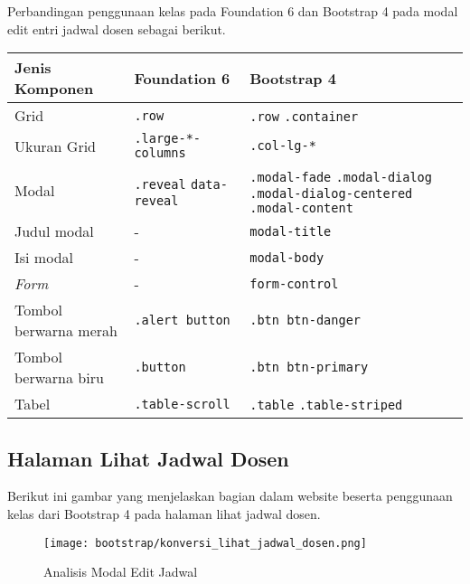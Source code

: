 \noindent Perbandingan penggunaan kelas pada Foundation 6 dan Bootstrap 4 pada modal edit entri jadwal dosen sebagai berikut.\\
\begin{tabular}{| p{} | p{} | p{} |} 
	\hline
	\textbf{Jenis Komponen} & \textbf{Foundation 6} & \textbf{Bootstrap 4}  \\ [0.5ex] 
	\hline	
	Grid & \texttt{.row} & \texttt{.row} \newline \texttt{.container} \\
	\hline
	Ukuran Grid & \texttt{.large-*-columns} & \texttt{.col-lg-*}\\
	\hline	
	Modal & \texttt{.reveal} \newline \texttt{data-reveal} & \texttt{.modal-fade} \newline \texttt{.modal-dialog} \newline \texttt{.modal-dialog-centered} \newline \texttt{.modal-content} \\
	\hline
	Judul modal & - & \texttt{modal-title}\\
	\hline
	Isi modal & - & \texttt{modal-body}\\
	\hline
	\textit{Form} & - & \texttt{form-control}\\
	\hline
	Tombol berwarna merah & \texttt{.alert button} & \texttt{.btn btn-danger}\\
	\hline		
	Tombol berwarna biru & \texttt{.button}  & \texttt{.btn btn-primary}\\
	\hline
	Tabel & \texttt{.table-scroll} & \texttt{.table} \newline \texttt{.table-striped} \\[1ex]
	\hline
\end{tabular}

\subsection{Halaman Lihat Jadwal Dosen}
\noindent Berikut ini gambar yang menjelaskan bagian dalam website beserta penggunaan kelas dari Bootstrap 4 pada halaman lihat jadwal dosen.\\

\begin{figure} [H]
	\centering  
	\texttt{[image: bootstrap/konversi\_lihat\_jadwal\_dosen.png]}
	\caption{Analisis Modal Edit Jadwal}
\end{figure}

